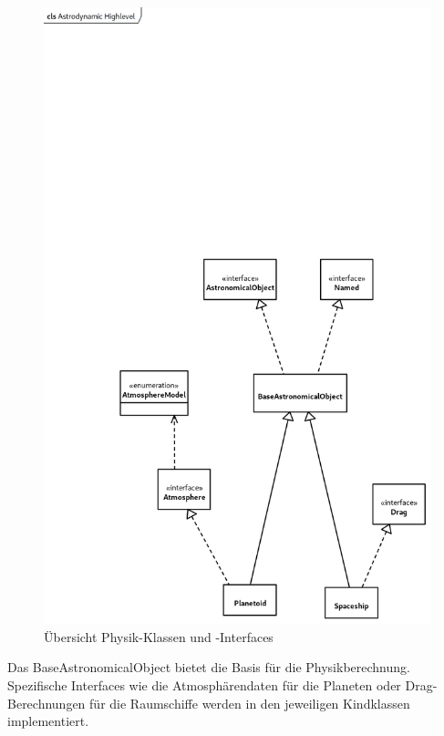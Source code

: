 \begin{figure}[H]
	\centering
	\includegraphics[width=12cm]{res/AstrodynamicHighlevel.png}
	\caption{Übersicht Physik-Klassen und -Interfaces}
\end{figure}

Das BaseAstronomicalObject bietet die Basis für die Physikberechnung. Spezifische Interfaces wie die Atmosphärendaten für die Planeten oder Drag-Berechnungen für die Raumschiffe werden in den jeweiligen Kindklassen implementiert.

